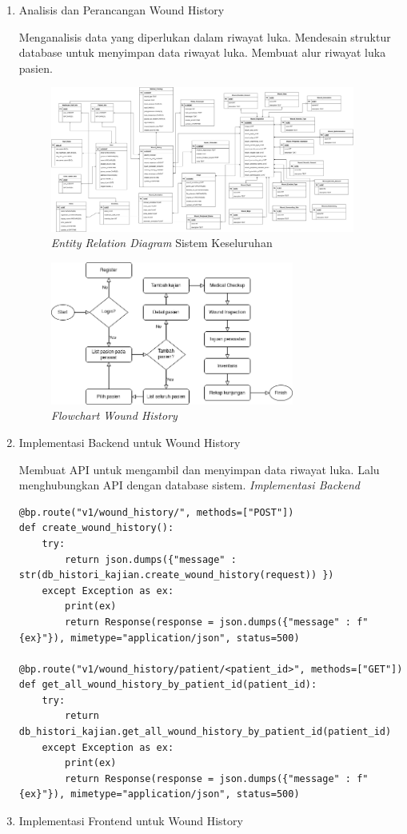 \begin{enumerate}
\item Analisis dan Perancangan Wound History

Menganalisis data yang diperlukan dalam riwayat luka. Mendesain struktur database untuk menyimpan data riwayat luka. Membuat alur riwayat luka pasien.
	\begin{figure}[H]
		\centering
		\includegraphics[keepaspectratio, width=10cm]{gambar/erd_full}
		\caption{\textit{Entity Relation Diagram} Sistem Keseluruhan}
		\label{gambar:erd_sprint_6}
	\end{figure}
	\begin{figure}[H]
		\centering
		\includegraphics[keepaspectratio, width=8cm]{gambar/flowchart_wound_history}
		\caption{\textit{Flowchart Wound History}}
		\label{gambar:flowchart_wound_history}
	\end{figure}
\item Implementasi Backend untuk Wound History

Membuat API untuk mengambil dan menyimpan data riwayat luka. Lalu menghubungkan API dengan database sistem.
\textit{Implementasi Backend}
\begin{lstlisting}
@bp.route("v1/wound_history/", methods=["POST"])
def create_wound_history():
    try:
        return json.dumps({"message" : str(db_histori_kajian.create_wound_history(request)) })
    except Exception as ex:
        print(ex)
        return Response(response = json.dumps({"message" : f"{ex}"}), mimetype="application/json", status=500)
    
@bp.route("v1/wound_history/patient/<patient_id>", methods=["GET"])
def get_all_wound_history_by_patient_id(patient_id):
    try:
        return db_histori_kajian.get_all_wound_history_by_patient_id(patient_id)
    except Exception as ex:
        print(ex)
        return Response(response = json.dumps({"message" : f"{ex}"}), mimetype="application/json", status=500)
\end{lstlisting}
\item Implementasi Frontend untuk Wound History


\end{enumerate}
